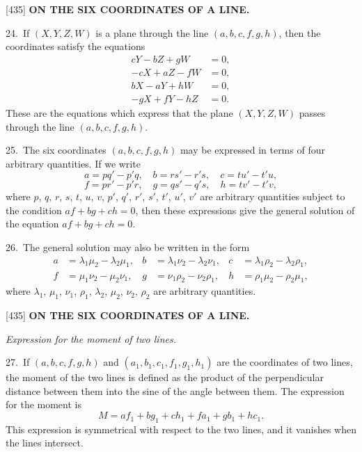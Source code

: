 \documentclass[12pt,a4paper]{article}
\newcommand{\paperref}[1]{\textup{[#1]}}
\theoremstyle{definition}
\begin{document}
\newpage
\setcounter{page}{76}

\noindent\paperref{435}\quad
\textbf{ON THE SIX COORDINATES OF A LINE.}

24.~If $(X, Y, Z, W)$ is a plane through the line $(a, b, c, f, g, h)$, then the coordinates satisfy the equations
\begin{align*}
c Y - b Z + g W &= 0,\\
-c X + a Z - f W &= 0,\\
b X - a Y + h W &= 0,\\
-g X + f Y - h Z &= 0.
\end{align*}
These are the equations which express that the plane $(X, Y, Z, W)$ passes through the line $(a, b, c, f, g, h)$.

25.~The six coordinates $(a, b, c, f, g, h)$ may be expressed in terms of four arbitrary quantities. If we write
\[
a = p q' - p' q, \quad b = r s' - r' s, \quad c = t u' - t' u,
\]
\[
f = p r' - p' r, \quad g = q s' - q' s, \quad h = t v' - t' v,
\]
where $p$, $q$, $r$, $s$, $t$, $u$, $v$, $p'$, $q'$, $r'$, $s'$, $t'$, $u'$, $v'$ are arbitrary quantities subject to the condition $af + bg + ch = 0$, then these expressions give the general solution of the equation $af + bg + ch = 0$.

26.~The general solution may also be written in the form
\begin{align*}
a &= \lambda_1 \mu_2 - \lambda_2 \mu_1, & b &= \lambda_1 \nu_2 - \lambda_2 \nu_1, & c &= \lambda_1 \rho_2 - \lambda_2 \rho_1,\\
f &= \mu_1 \nu_2 - \mu_2 \nu_1, & g &= \nu_1 \rho_2 - \nu_2 \rho_1, & h &= \rho_1 \mu_2 - \rho_2 \mu_1,
\end{align*}
where $\lambda_1$, $\mu_1$, $\nu_1$, $\rho_1$, $\lambda_2$, $\mu_2$, $\nu_2$, $\rho_2$ are arbitrary quantities.

\newpage
\setcounter{page}{77}

\noindent\paperref{435}\quad
\textbf{ON THE SIX COORDINATES OF A LINE.}

\textit{Expression for the moment of two lines.}

27.~If $(a, b, c, f, g, h)$ and $(a_1, b_1, c_1, f_1, g_1, h_1)$ are the coordinates of two lines, the moment of the two lines is defined as the product of the perpendicular distance between them into the sine of the angle between them. The expression for the moment is
\[
M = a f_1 + b g_1 + c h_1 + f a_1 + g b_1 + h c_1.
\]
This expression is symmetrical with respect to the two lines, and it vanishes when the lines intersect.
\end{document}
